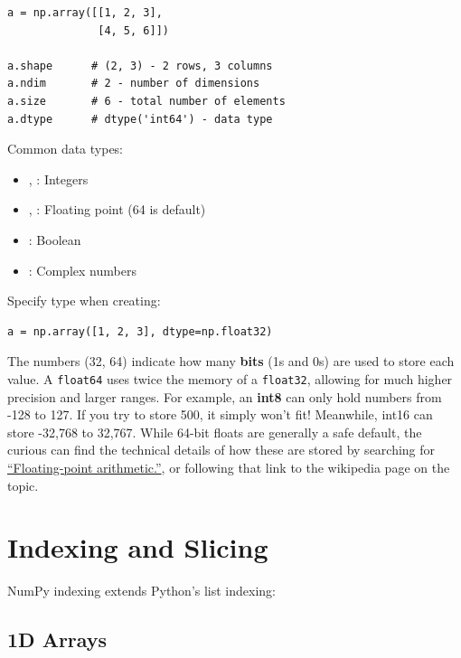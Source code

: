 \begin{lstlisting}
a = np.array([[1, 2, 3],
              [4, 5, 6]])

a.shape      # (2, 3) - 2 rows, 3 columns
a.ndim       # 2 - number of dimensions
a.size       # 6 - total number of elements
a.dtype      # dtype('int64') - data type
\end{lstlisting}

Common data types:
\begin{itemize}
    \item {}, : Integers
    \item {}, : Floating point (64 is default)
    \item {}: Boolean
    \item {}: Complex numbers
\end{itemize}

Specify type when creating:
\begin{lstlisting}
a = np.array([1, 2, 3], dtype=np.float32)
\end{lstlisting}

\begin{tip}
The numbers (32, 64) indicate how many \textbf{bits} (1s and 0s) are used to store each value. A \texttt{float64} uses twice the memory of a \texttt{float32}, allowing for much higher precision and larger ranges. For example, an \textbf{int8} can only hold numbers from -128 to 127. If you try to store 500, it simply won't fit! Meanwhile, int16 can store -32,768 to 32,767. While 64-bit floats are generally a safe default, the curious can find the technical details of how these are stored by searching for \href{https://en.wikipedia.org/wiki/Floating-point_arithmetic}{``Floating-point arithmetic.''}, or following that link to the wikipedia page on the topic.
\end{tip}

\section{Indexing and Slicing}
\label{sec:numpy-indexing}

NumPy indexing extends Python's list indexing:

\subsection{1D Arrays}

